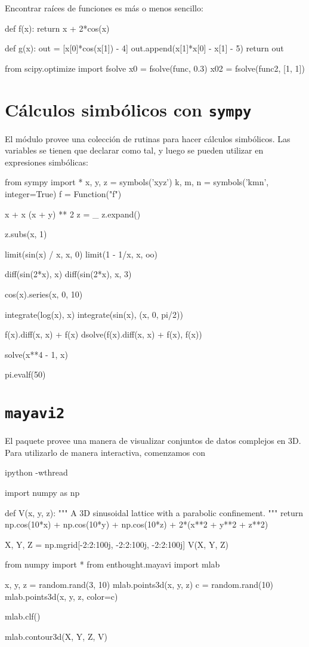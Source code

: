 Encontrar raíces de funciones es más o menos sencillo:
\begin{python}
def f(x):
  return x + 2*cos(x)

def g(x):
  out = [x[0]*cos(x[1]) - 4]	
  out.append(x[1]*x[0] - x[1] - 5)
  return out

from scipy.optimize import fsolve
x0 = fsolve(func, 0.3)
x02 = fsolve(func2, [1, 1])
\end{python}


\section{Cálculos simbólicos con \texttt{sympy}}
El módulo  provee una colección de rutinas para hacer cálculos simbólicos.
Las variables se tienen que declarar como tal, y luego se pueden utilizar en expresiones simbólicas:
\begin{python}
from sympy import *
x, y, z = symbols('xyz')
k, m, n = symbols('kmn', integer=True)
f = Function("f")

x + x
(x + y) ** 2
z = _
z.expand()

z.subs(x, 1)

limit(sin(x) / x, x, 0)
limit(1 - 1/x, x, oo)

diff(sin(2*x), x)
diff(sin(2*x), x, 3)

cos(x).series(x, 0, 10)

integrate(log(x), x)
integrate(sin(x), (x, 0, pi/2))

f(x).diff(x, x) + f(x)
dsolve(f(x).diff(x, x) + f(x), f(x))

solve(x**4 - 1, x)

pi.evalf(50)
\end{python}


\section{\texttt{mayavi2}}

 El paquete  provee una manera de visualizar conjuntos de datos complejos en 3D. Para utilizarlo de manera interactiva, comenzamos con
\begin{python}
ipython -wthread

import numpy as np

def V(x, y, z):
    """ A 3D sinusoidal lattice with a parabolic confinement. """
    return np.cos(10*x) + np.cos(10*y) + np.cos(10*z) + 2*(x**2 + y**2 + z**2)

X, Y, Z = np.mgrid[-2:2:100j, -2:2:100j, -2:2:100j]
V(X, Y, Z)

from numpy import *
from enthought.mayavi import mlab

x, y, z = random.rand(3, 10)
mlab.points3d(x, y, z)
c = random.rand(10)
mlab.points3d(x, y, z, color=c)

mlab.clf()

mlab.contour3d(X, Y, Z, V)


\end{python}


